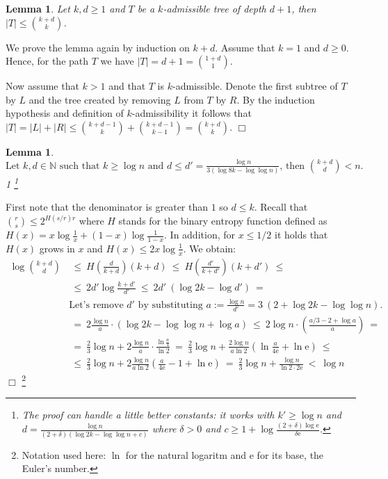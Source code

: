 \documentclass[11pt]{article}
\newtheorem{lemma}[theorem]{Lemma}
\newcommand{\qed}{$\Box$}
\newenvironment{proof}{\noindent {\bf Proof:}}{\hfill \qed \smallskip}
\newcommand{\N}{\mathbb{N}}
\begin{document}
\begin{lemma}
\label{lm:k-d-size}
Let $k,d \geq 1$ and $T$ be a $k$-admissible tree of depth $d+1$,
then $|T| \leq \binom{k + d}{k}$.
\end{lemma}
\begin{proof}
We prove the lemma again by induction on $k + d$. Assume that $k = 1$ and $d \geq 0$. Hence, for the path $T$ we have $|T| = d+1 = \binom{1 + d}{1}$.

Now assume that $k > 1$ and that $T$ is $k$-admissible.
Denote the first subtree of $T$ by $L$ and the tree created by removing $L$ from $T$ by $R$.
By the induction hypothesis and definition of $k$-admissibility it follows that $|T| = |L| + |R| \leq \binom{k + d - 1}{k} + \binom{k + d - 1}{k - 1} = \binom{k + d}{k}$.
\end{proof}

{
\newcommand{\esp}{ \ =  \ }
\newcommand{\lesp}{\ \le \ }
\newcommand{\ltsp}{\  < \ }
\newcommand{\euler}{ \mathrm{e} }
	\begin{lemma} \label{lm:lower_bound_d}
	$%
		\text{Let } k,d \in \N \text{ such that } k \ge \log n \text{ and } d \le d' = \frac{\log n}{3 (\log 8k - \log\log n)}
		\text{,  then } \binom{k + d}{d} < n.$%
	 1
		\footnote{The proof can handle a little better constants: it works with $k'\ge\log n$
		and $d=\frac{\log n}{(2+\delta)(\log2k-\log\log n+c)}$ where
		$\delta>0$ and $c\ge1+\log\frac{(2+\delta)\log\mathrm{e}}{\delta\mathrm{e}}$.%
		}
	\fi
	\end{lemma}
	\begin{proof}
	First note that the denominator is greater than $1$ so $d \le k$.
	Recall that $\binom{r}{s} \leq 2^{H(s/r) r}$
	where $H$ stands for the binary entropy function
	defined as $H(x) = x \log\frac{1}{x} + (1-x) \log\frac{1}{1-x}$.
	In addition, for $ x \le 1/2$ it holds that $H(x)$ grows in $x$
	and $H(x) \le 2x \log\frac{1}{x}$.
	We obtain: 
	\begin{align*}
	\log\!\binom{k + d}{d}
		& \lesp H\!\left( \frac{d}{k + d} \right) (k + d)
		\lesp H\!\left( \frac{d'}{k + d'} \right) (k + d') \lesp
	\\ & \lesp 2d' \log\frac{k + d'}{d'}
		\lesp 2d' \ (\log 2k - \log d') \esp
	\\ & \mbox{Let's remove $d'$ by substituting
		$a := \frac{\log n}{d'} = 3 \: (2 + \log 2k - \log\log n)$.}
	\\ & \esp 2 \frac{\log n}{a} \cdot ( \log 2k - \log\log n + \log a ) 
		\lesp 2 \log n \cdot \left( \frac{a/3 - 2 + \log a}{a} \right) \esp
	\\ & \esp \frac{2}{3} \log n + 2 \frac{\log n}{a}
			\cdot \frac{\ln\frac{a}{4}}{\ln 2}
		\esp \frac{2}{3} \log n + \frac{2 \log n}{a \ln 2}
			\left( \ln \frac{a}{4 \euler} + \ln \euler \right) \lesp
	\\ & \lesp \frac{2}{3} \log n + 2 \frac{\log n}{a \ln 2}
			\left( \frac{a}{4 \euler} - 1 + \ln \euler \right)
		\esp \frac{2}{3} \log n + \frac{\log n}{\ln 2 \cdot 2 \euler}
		\ltsp \log n
	\end{align*}
	\end{proof}%
	\footnote{Notation used here: $\ln$ for the natural logaritm and $\euler$ for its base, the Euler's number.}
}
\end{document}
